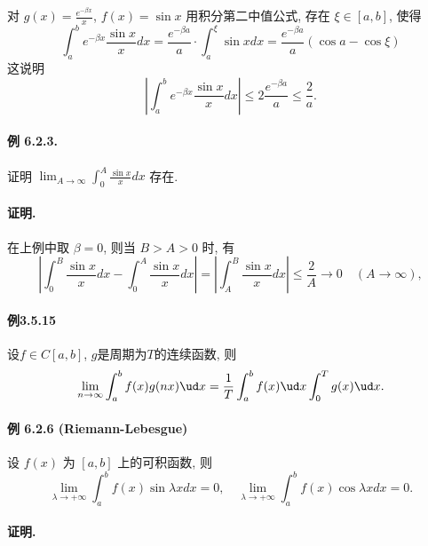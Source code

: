 对 $g(x)=\frac{e^{-\beta x}}{x}$, $f(x)=\sin x$ 用积分第二中值公式, 存在 $\xi\in[a,b]$,
使得 
\[
\int_{a}^{b}e^{-\beta x}\frac{\sin x}{x}dx=\frac{e^{-\beta a}}{a}\cdot\int_{a}^{\xi}\sin xdx=\frac{e^{-\beta a}}{a}(\cos a-\cos\xi)
\]
这说明 
\[
\left|\int_{a}^{b}e^{-\beta x}\frac{\sin x}{x}dx\right|\leqslant2\frac{e^{-\beta a}}{a}\leqslant\frac{2}{a}.
\]


\paragraph{例 6.2.3. }

证明 $\lim_{A\rightarrow\infty}\int_{0}^{A}\frac{\sin x}{x}dx$ 存在. 

\paragraph{证明. }

在上例中取 $\beta=0$, 则当 $B>A>0$ 时, 有
\[
\left|\int_{0}^{B}\frac{\sin x}{x}dx-\int_{0}^{A}\frac{\sin x}{x}dx\right|=\left|\int_{A}^{B}\frac{\sin x}{x}dx\right|\leqslant\frac{2}{A}\rightarrow0\quad(A\rightarrow\infty),
\]


\paragraph{例3.5.15}

设$f\in C[a,b]$, $g$是周期为$T$的连续函数, 则
\[
\lim_{n\to\infty}\int_{a}^{b}f(x)g(nx)\ud x=\frac{1}{T}\int_{a}^{b}f(x)\ud x\int_{0}^{T}g(x)\ud x.
\]


\paragraph{例 6.2.6 (Riemann-Lebesgue)}

设 $f(x)$ 为 $[a,b]$ 上的可积函数, 则
\[
\lim_{\lambda\rightarrow+\infty}\int_{a}^{b}f(x)\sin\lambda xdx=0,\quad\lim_{\lambda\rightarrow+\infty}\int_{a}^{b}f(x)\cos\lambda xdx=0.
\]


\paragraph{证明. }

